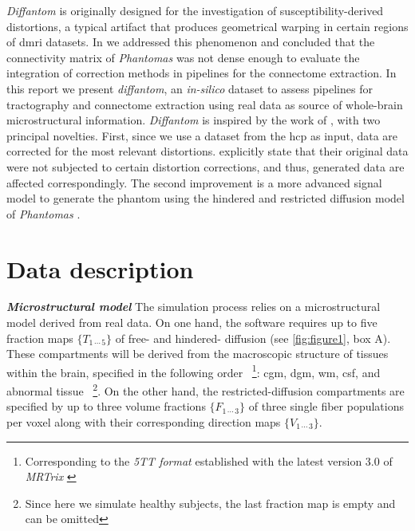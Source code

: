 \documentclass[english]{frontiers/frontiersSCNS} %
\begin{document}
\emph{Diffantom} is originally designed for the investigation of susceptibility-derived distortions, a
  typical artifact that produces geometrical warping in certain regions of \gls*{dmri} datasets.
In \citep{esteban_simulationbased_2014} we addressed this phenomenon and concluded that the connectivity
  matrix of \emph{Phantomas} was not dense enough to evaluate the integration of correction methods
  in pipelines for the connectome extraction.
In this report we present \emph{diffantom}, an \emph{in-silico} dataset to assess pipelines for tractography
  and connectome extraction using real data as source of whole-brain microstructural information.
\emph{Diffantom} is inspired by the work of \cite{wilkins_fiber_2014}, with two principal novelties.
First, since we use a dataset from the \gls*{hcp} as input, data are corrected for the most relevant distortions.
\cite{wilkins_fiber_2014} explicitly state that their original data were not subjected to certain distortion
  corrections, and thus, generated data are affected correspondingly.
The second improvement is a more advanced signal model to generate the phantom using the hindered and restricted
  diffusion model of \emph{Phantomas} \citep{caruyer_phantomas_2014}.


\section*{Data description}

\noindent\textbf{\textit{Microstructural model\textcolon}\label{sec:data_model}} %
The simulation process relies on a microstructural model derived from real data.
On one hand, the software requires up to five fraction maps $\{T_{1\,\cdots\,5}\}$ of
  free- and hindered- diffusion (see \autoref{fig:figure1}, box A).
These compartments will be derived from the macroscopic structure of tissues within the brain,
  specified in the following order~%
\footnote{Corresponding to the \emph{5TT format} established with the latest version 3.0
  of \emph{MRTrix} \citep{tournier_mrtrix_2012}}:
\gls*{cgm}, \gls*{dgm}, \gls*{wm}, \gls*{csf}, and abnormal tissue~%
\footnote{Since here we simulate healthy subjects, the last fraction map is empty and can be omitted}.
On the other hand, the restricted-diffusion compartments are specified by up to three volume fractions $\{F_{1\,\cdots\,3}\}$
  of three single fiber populations per voxel along with their corresponding direction maps $\{V_{1\,\cdots\,3}\}$.
\end{document}

